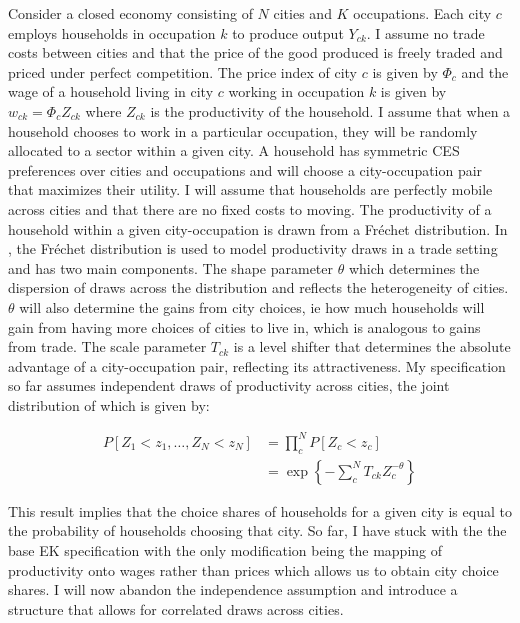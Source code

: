 \documentclass[10pt]{article}
\begin{document}
Consider a closed economy consisting of $N$ cities and $K$ occupations. Each city $c$ employs households in occupation $k$ to produce output $Y_{ck}$. I assume no trade costs between cities and that the price of the good produced is freely traded and priced under perfect competition. The price index of city $c$ is given by $\Phi_c$ and the wage of a household living in city $c$ working in occupation $k$ is given by $w_{ck} = \Phi_c Z_{ck}$ where $Z_{ck}$ is the productivity of the household. I assume that when a household chooses to work in a particular occupation, they will be randomly allocated to a sector within a given city. A household has symmetric CES preferences over cities and occupations and will choose a city-occupation pair that maximizes their utility. I will assume that households are perfectly mobile across cities and that there are no fixed costs to moving. The productivity of a household within a given city-occupation is drawn from a Fr\'{e}chet distribution. In \cite{ek}, the Fr\'{e}chet distribution is used to model productivity draws in a trade setting and has two main components. The shape parameter $\theta$ which determines the dispersion of draws across the distribution and reflects the heterogeneity of cities. $\theta$ will also determine the gains from city choices, ie how much households will gain from having more choices of cities to live in, which is analogous to gains from trade. The scale parameter $T_{ck}$ is a level shifter that determines the absolute advantage of a city-occupation pair, reflecting its attractiveness. My specification so far assumes independent draws of productivity across cities, the joint distribution of which is given by:

\begin{align*}
    P[Z_1 < z_1, \dots, Z_N < z_N] & = \prod_{c}^{N} P[Z_c < z_c]                                 \\
                                   & = \exp \left\{ - \sum_{c}^{N} T_{ck} Z_c^{- \theta} \right\}
\end{align*}

This result implies that the choice shares of households for a given city is equal to the probability of households choosing that city. So far, I have stuck with the the base EK specification with the only modification being the mapping of productivity onto wages rather than prices which allows us to obtain city choice shares. I will now abandon the independence assumption and introduce a structure that allows for correlated draws across cities.
\end{document}
